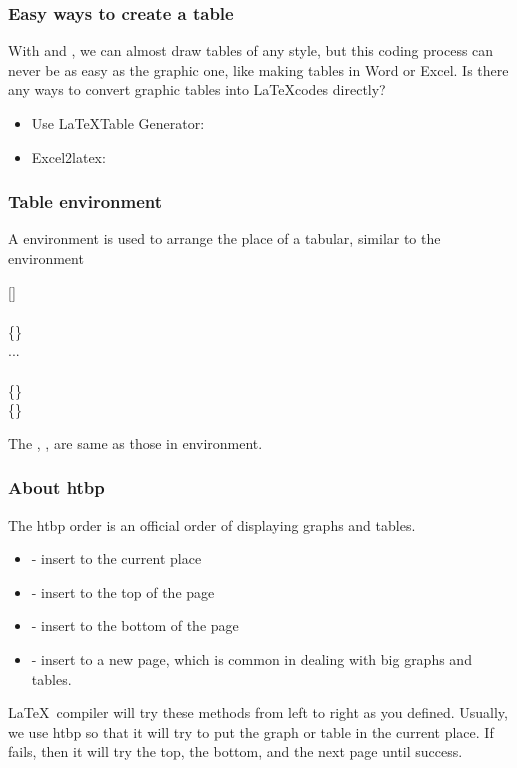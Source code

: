 \begin{frame}
	\frametitle{Easy ways to create a table}
	With  and , we can almost draw tables of any style, but this coding process can never be as easy as the graphic one, like making tables in Word or Excel. Is there any ways to convert graphic tables into \LaTeX codes directly?\\
	\begin{itemize}
		\item Use \LaTeX Table Generator: 
		\item Excel2latex: 
	\end{itemize}
	
\end{frame}

\begin{frame}
	\frametitle{Table environment}
    A  environment is used to arrange the place of a tabular, similar to the  environment
    \begin{command}
    	[]\\
    	\qquad {}\\
    	\qquad {}\{\}\\
    	\qquad \qquad ...\\
    	\qquad {}\\
    	\qquad {}\{\}\\
    	\qquad {}\{\}\\
	\end{command}
	The , ,  are same as those in  environment. 
\end{frame}

\begin{frame}
	\frametitle{About htbp}
	The htbp order is an official order of displaying graphs and tables.
	\begin{itemize}
		\item {} - insert to the current place
		\item {} - insert to the top of the page
		\item {} - insert to the bottom of the page
		\item {} - insert to a new page, which is common in dealing with big graphs and tables.
	\end{itemize}
	\LaTeX\ compiler will try these methods from left to right as you defined. Usually, we use htbp so that it will try to put the graph or table in the current place. If fails, then it will try the top, the bottom, and the next page until success.
\end{frame}


